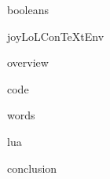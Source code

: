 
\usemodule[t-diSimp]

\startDiSimpComponent booleans

\diSimpEnvironment joyLoLConTeXtEnv

\startJoyLoLCoAlg[title=Booleans][booleans]

\diSimpComponent overview

\diSimpComponent code

\diSimpComponent words

\diSimpComponent lua

\diSimpComponent conclusion

\stopJoyLoLCoAlg

\stopDiSimpComponent
